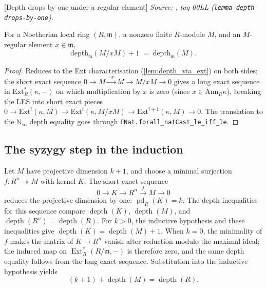 \begin{lemma}

  [Depth drops by one under a regular element]
  \label{lem:depth_drops_by_one}
  \textit{Source: \cite{stacks-project}, tag 00LL (\texttt{lemma-depth-drops-by-one}).}

  For a Noetherian local ring \((R, \mathfrak m)\), a nonzero finite
  \(R\)-module \(M\), and an \(M\)-regular element \(x \in \mathfrak m\),
  \[
    \text{depth}_{\mathfrak m}(M/xM) + 1 \;=\; \text{depth}_{\mathfrak m}(M).
  \]
\end{lemma}
\begin{proof}

  Reduces to the Ext characterisation
  (\cref{lem:depth_via_ext}) on both sides; the short exact sequence
  \(0 \to M \xrightarrow{\,\cdot x\,} M \to M/xM \to 0\) gives a
  long exact sequence in \(\text{Ext}^*_R(\kappa, -)\) on which
  multiplication by \(x\) is zero (since \(x \in \text{Ann}_R \kappa\)),
  breaking the LES into short exact pieces
  \(0 \to \text{Ext}^i(\kappa, M) \to \text{Ext}^i(\kappa, M/xM) \to
  \text{Ext}^{i+1}(\kappa, M) \to 0\). The translation to the
  \(\mathbb N_\infty\) depth equality goes through
  \texttt{ENat.forall\_natCast\_le\_iff\_le}.
\end{proof}

\subsection{The syzygy step in the induction}
\label{subsec:succ_pd_gap_sequence}

Let \(M\) have projective dimension \(k+1\), and choose a minimal surjection
\(f : R^n \twoheadrightarrow M\) with kernel \(K\). The short exact sequence
\[
  0 \longrightarrow K \longrightarrow R^n \xrightarrow{f} M \longrightarrow 0
\]
reduces the projective dimension by one: \(\operatorname{pd}_R(K)=k\).
The depth inequalities for this sequence compare
\(\operatorname{depth}(K)\), \(\operatorname{depth}(M)\), and
\(\operatorname{depth}(R^n)=\operatorname{depth}(R)\). For \(k>0\), the
inductive hypothesis and these inequalities give
\(\operatorname{depth}(K)=\operatorname{depth}(M)+1\). When \(k=0\), the
minimality of \(f\) makes the matrix of \(K\to R^n\) vanish after reduction
modulo the maximal ideal; the induced map on
\(\operatorname{Ext}^*_R(R/\mathfrak m,-)\) is therefore zero, and the same
depth equality follows from the long exact sequence. Substitution into the
inductive hypothesis yields
\[
  (k+1)+\operatorname{depth}(M)=\operatorname{depth}(R).
\]


